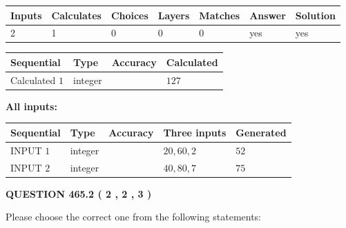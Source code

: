 \documentclass[12pt]{article}
\begin{document}
 
\noindent{}
 
 

 
   
   
   
   
\noindent\begin{tabular}{|l|l|l|l|l|l|l|}
 \hline
Inputs & Calculates & Choices & Layers & Matches & Answer & Solution \\ \hline
 2  & 
 1  & 
 0
  & 
 0  & 
 0  & 
  yes & 
  yes 
  \\ \hline
 \end{tabular}
   
   
   
   
\noindent{}
   
   
  
  
\noindent\begin{tabular}{|l|l|l|l|}
\hline
 Sequential & Type & Accuracy & Calculated \\ 
\hline
 
 
  Calculated $  1 $ & integer &  & 
  $ 127 $ 
 \\  \hline  
 \end{tabular}
   
   
   
   
\noindent\vspace{0.1in}\hspace{-0.08in} {\textbf{\Large{All inputs: }}}
   
   
  
  
\noindent\begin{tabular}{|l|l|l|l|l|}
\hline
 Sequential & Type & Accuracy & Three inputs & Generated \\ 
\hline
 
 
  INPUT $  1 $ & integer &  & $
 20
 , 
 60
 , 
 2
 $ & $ 52 $ 
 \\  \hline  
 
 
  INPUT $  2 $ & integer &  & $
 40
 , 
 80
 , 
 7
 $ & $ 75 $ 
 \\  \hline  
 \end{tabular}
   
   
  
\vspace{0.2in}
  
{\textbf{\Large{QUESTION
465.2 
 ( 2 , 2 , 3 )
}}}
  
  
Please choose the correct one from the following statements:
 
\end{document}

